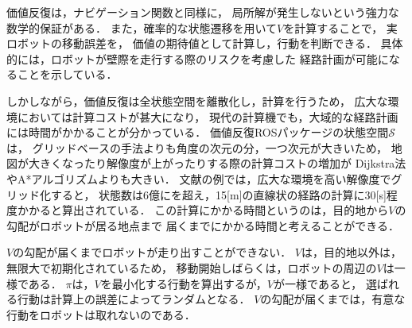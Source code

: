 価値反復は，ナビゲーション関数と同様に，
局所解が発生しないという強力な数学的保証がある．
また，確率的な状態遷移を用いて$V$を計算することで，
実ロボットの移動誤差を，
価値の期待値として計算し，行動を判断できる．
具体的には，ロボットが壁際を走行する際のリスクを考慮した
経路計画が可能になることを示している\cite{Thrun2005}．

しかしながら，価値反復は全状態空間を離散化し，計算を行うため，
広大な環境においては計算コストが甚大になり，
現代の計算機でも，大域的な経路計画には時間がかかることが分かっている．
価値反復ROSパッケージの状態空間$\mathcal{S}$は，
グリッドベースの手法よりも角度の次元の分，一つ次元が大きいため，
地図が大きくなったり解像度が上がったりする際の計算コストの増加が
Dijkstra法やA*アルゴリズムよりも大きい．
文献\cite{Ueda2023jrm}の例では，広大な環境を高い解像度でグリッド化すると，
状態数は6億にを超え，15[m]の直線状の経路の計算に30[s]程度かかると算出されている．
この計算にかかる時間というのは，目的地から$V$の勾配がロボットが居る地点まで
届くまでにかかる時間と考えることができる．

$V$の勾配が届くまでロボットが走り出すことができない．
$V$は，目的地以外は，無限大で初期化されているため，
移動開始しばらくは，ロボットの周辺の$V$は一様である．
$\pi$は，$V$を最小化する行動を算出するが，$V$が一様であると，
選ばれる行動は計算上の誤差によってランダムとなる．
$V$の勾配が届くまでは，有意な行動をロボットは取れないのである．

